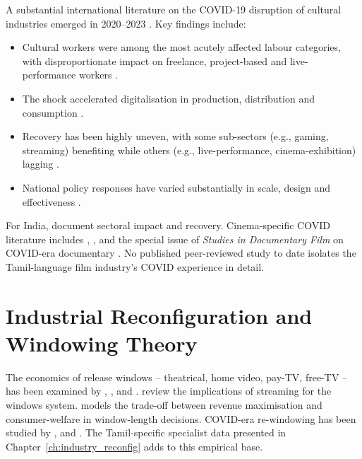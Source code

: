 A substantial international literature on the COVID-19 disruption of
cultural industries emerged in 2020--2023 \citep{flew2021,florida2020,
comunian2021,banks2020,khlystova2022}.  Key findings include:

\begin{itemize}[itemsep=2pt]
  \item Cultural workers were among the most acutely affected
        labour categories, with disproportionate impact on
        freelance, project-based and live-performance workers
        \citep{comunian2021,banks2020}.
  \item The shock accelerated digitalisation in production,
        distribution and consumption \citep{flew2021,khlystova2022}.
  \item Recovery has been highly uneven, with some sub-sectors
        (e.g., gaming, streaming) benefiting while others
        (e.g., live-performance, cinema-exhibition) lagging
        \citep{ficciey2023,unesco2022culture}.
  \item National policy responses have varied substantially in
        scale, design and effectiveness
        \citep{flew2021,unesco2021culture}.
\end{itemize}

For India, \citet{ficciey2021,kpmg2021,kpmg2022,bcg2022} document
sectoral impact and recovery.  Cinema-specific COVID literature
includes \citet{vasileva2021}, \citet{nichols2021},
\citet{tryon2021covid} and the special issue of \emph{Studies in
Documentary Film} on COVID-era documentary
\citep{aufderheide2021special}.  No published peer-reviewed study
to date isolates the Tamil-language film industry's COVID experience
in detail.

\section{Industrial Reconfiguration and Windowing Theory}
\label{sec:windowing}

The economics of release windows -- theatrical, home video, pay-TV,
free-TV -- has been examined by \citet{vogel2020}, \citet{epstein2010},
\citet{waterman2005} and \citet{dewenter2017}.  \citet{cunningham2019}
review the implications of streaming for the windows system.
\citet{vogel2020} models the trade-off between revenue maximisation
and consumer-welfare in window-length decisions.  COVID-era
re-windowing has been studied by \citet{schauerte2021},
\citet{waterman2022pandemic} and \citet{garcia2023streaming}.  The
Tamil-specific specialist data presented in
Chapter~\ref{ch:industry_reconfig} adds to this empirical base.

